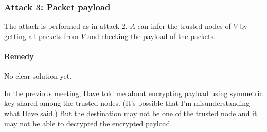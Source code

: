 \documentclass[11pt]{article}
\begin{document}
\subsubsection{Attack 3: Packet payload}
The attack is performed as in attack 2. 
$A$ can infer the trusted nodes of $V$ by getting all packets from $V$ and checking the payload of the packets. 


\paragraph{Remedy}
No clear solution yet. 

In the previous meeting, Dave told me about encrypting payload using symmetric key shared among the trusted nodes. 
(It's possible that I'm misunderstanding what Dave said.)
But the destination may not be one of the trusted node and it may not be able to decrypted the encrypted payload. 
\end{document}
